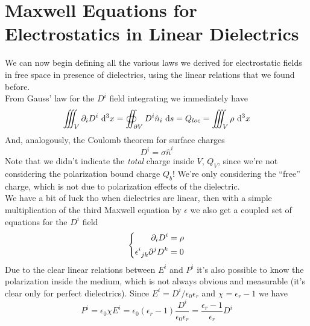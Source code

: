 \documentclass[../electromagnetism]{subfiles}
\begin{document}
\section{Maxwell Equations for Electrostatics in Linear Dielectrics}
We can now begin defining all the various laws we derived for electrostatic fields in free space in presence of dielectrics, using the linear relations that we found before.\\
From Gauss' law for the $D^i$ field integrating we immediately have
\begin{equation}
	\iiint_V\partial_iD^i\ \mathrm{d}^3x=\oiint_{\partial V}D^i\hat{n}_i\ \mathrm{d} s=Q_{loc}=\iiint_V\rho\ \mathrm{d}^3x
	\label{eq:gausslawD}
\end{equation}
And, analogously, the Coulomb theorem for surface charges
\begin{equation}
	D^i=\sigma\hat{n}^i
	\label{eq:coulombthmD}
\end{equation}
Note that we didn't indicate the \emph{total} charge inside $V$, $Q_V$, since we're not considering the polarization bound charge $Q_b$! We're only considering the ``free'' charge, which is not due to polarization effects of the dielectric.\\
We have a bit of luck tho when dielectrics are linear, then with a simple multiplication of the third Maxwell equation by $\epsilon$ we also get a coupled set of equations for the $D^i$ field
\begin{equation}
	\left\{ \begin{aligned}
		\partial_iD^i&=\rho\\
		\epsilon^{i}_{\ jk}\partial^jD^k&=0
\end{aligned}\right.
	\label{eq:lindiemweseq}
\end{equation}
Due to the clear linear relations between $E^i$ and $P^i$ it's also possible to know the polarization inside the medium, which is not always obvious and measurable (it's clear only for perfect dielectrics). Since $E^i=D^i/\epsilon_0\epsilon_r$ and $\chi=\epsilon_r-1$ we have
\begin{equation}
	P^i=\epsilon_0\chi E^i=\epsilon_0(\epsilon_r-1)\frac{D^i}{\epsilon_0\epsilon_r}=\frac{\epsilon_r-1}{\epsilon_r}D^i
	\label{eq:polarizationrelationdispfield}
\end{equation}
\end{document}
